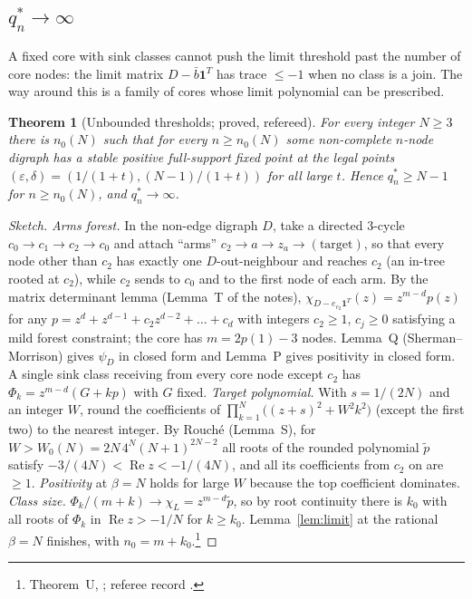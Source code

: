 \documentclass[11pt]{article}
\newtheorem{theorem}{Theorem}[section]
\theoremstyle{definition}
\newcommand{\one}{\mathbf{1}}
\newcommand{\eps}{\varepsilon}
\newcommand{\Rea}{\operatorname{Re}}
\begin{document}
\subsection{\texorpdfstring{$q_n^*\to\infty$}{q*_n -> infinity}}
A fixed core with sink classes cannot push the limit threshold past the number of core nodes: the limit matrix
$D-\bar b\one^T$ has trace $\le-1$ when no class is a join. The way around this is a family of cores whose limit polynomial can be
prescribed.

\begin{theorem}[Unbounded thresholds; proved, refereed]\label{thm:U}
For every integer $N\ge3$ there is $n_0(N)$ such that for every $n\ge n_0(N)$ some non-complete $n$-node digraph has a stable
positive full-support fixed point at the legal points $(\eps,\delta)=(1/(1+t),(N-1)/(1+t))$ for all large $t$. Hence
$q_n^*\ge N-1$ for $n\ge n_0(N)$, and $q_n^*\to\infty$.
\end{theorem}
\begin{proof}[Sketch]
\emph{Arms forest.} In the non-edge digraph $D$, take a directed $3$-cycle $c_0\to c_1\to c_2\to c_0$ and attach ``arms'' $c_2\to a\to z_a\to(\text{target})$,
so that every node other than $c_2$ has exactly one $D$-out-neighbour and reaches $c_2$ (an in-tree rooted at $c_2$), while $c_2$
sends to $c_0$ and to the first node of each arm. By the matrix determinant lemma (Lemma~T of the
notes), $\chi_{D-e_{c_2}\one^T}(z)=z^{m-d}p(z)$ for any $p=z^d+z^{d-1}+c_2z^{d-2}+\dots+c_d$ with integers $c_2\ge1$, $c_j\ge0$
satisfying a mild forest constraint; the core has $m=2p(1)-3$ nodes. Lemma~Q (Sherman--Morrison) gives $\psi_D$ in closed form and
Lemma~P gives positivity in closed form. A single sink class receiving from every core node except $c_2$ has
$\Phi_k=z^{m-d}(G+kp)$ with $G$ fixed.
\emph{Target polynomial.} With $s=1/(2N)$ and an integer $W$, round the coefficients of
$\prod_{k=1}^N\bigl((z+s)^2+W^2k^2\bigr)$ (except the first two) to the nearest integer. By Rouch\'e (Lemma~S), for
$W>W_0(N)=2N\,4^N(N+1)^{2N-2}$ all roots of the rounded polynomial $\tilde p$ satisfy $-3/(4N)<\Rea z<-1/(4N)$, and all its
coefficients from $c_2$ on are $\ge1$.
\emph{Positivity} at $\beta=N$ holds for large $W$ because the top coefficient dominates.
\emph{Class size.} $\Phi_k/(m+k)\to\chi_L=z^{m-d}\tilde p$, so by root continuity there is $k_0$ with all roots of $\Phi_k$ in
$\Rea z>-1/N$ for $k\ge k_0$. Lemma~\ref{lem:limit} at the rational $\beta=N$ finishes, with $n_0=m+k_0$.\footnote{Theorem~U, ; referee record .}
\end{proof}
\end{document}

